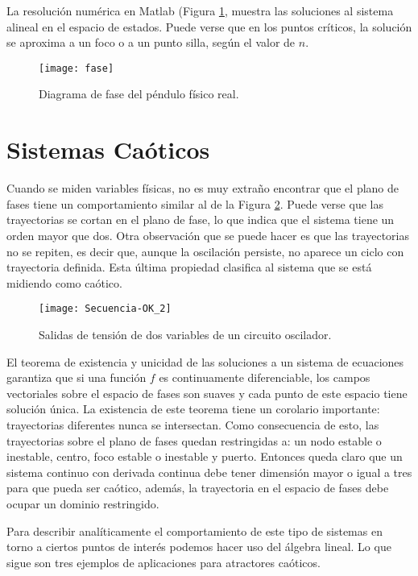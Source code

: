 La resolución numérica en Matlab (Figura \ref{fig:fase}, muestra las soluciones al sistema alineal en el espacio de estados.
Puede verse que en los puntos críticos, la solución se aproxima a un foco o a un punto silla, según el valor de $n$.
%
\begin{figure}
\centering\texttt{[image: fase]}
\caption{Diagrama de fase del péndulo físico real.}
\label{fig:fase}
\end{figure}

\section{Sistemas Caóticos}
\label{secSistCaot}

Cuando se miden variables físicas, no es muy extraño encontrar que el plano de fases tiene un comportamiento similar al de la Figura \ref{fig:Secuencia-OK_2}.
Puede verse que las trayectorias se cortan en el plano de fase, lo que indica que el sistema tiene un orden mayor que dos.
Otra observación que se puede hacer es que las trayectorias no se repiten, es decir que, aunque la oscilación persiste, no aparece un ciclo con trayectoria definida.
Esta última propiedad clasifica al sistema que se está midiendo como caótico.

\begin{figure}
\centering\texttt{[image: Secuencia-OK\_2]}
\caption{Salidas de tensión de dos variables de un circuito oscilador.}
\label{fig:Secuencia-OK_2}
\end{figure}

El teorema de existencia y unicidad de las soluciones a un sistema de ecuaciones garantiza que si una función $f$ es continuamente diferenciable, los campos vectoriales sobre el espacio de fases son suaves y cada punto de este espacio tiene solución única.
La existencia de este teorema tiene un corolario importante: trayectorias diferentes nunca se intersectan.
Como consecuencia de esto, las trayectorias sobre el plano de fases quedan restringidas a: un nodo estable o inestable, centro, foco estable o inestable y puerto.
Entonces queda claro que un sistema continuo con derivada continua debe tener dimensión mayor o igual a tres para que pueda ser caótico, además, la trayectoria en el espacio de fases debe ocupar un dominio restringido.

Para describir analíticamente el comportamiento de este tipo de sistemas en torno a ciertos puntos de interés podemos hacer uso del álgebra lineal.
Lo que sigue son tres ejemplos de aplicaciones para atractores caóticos.

